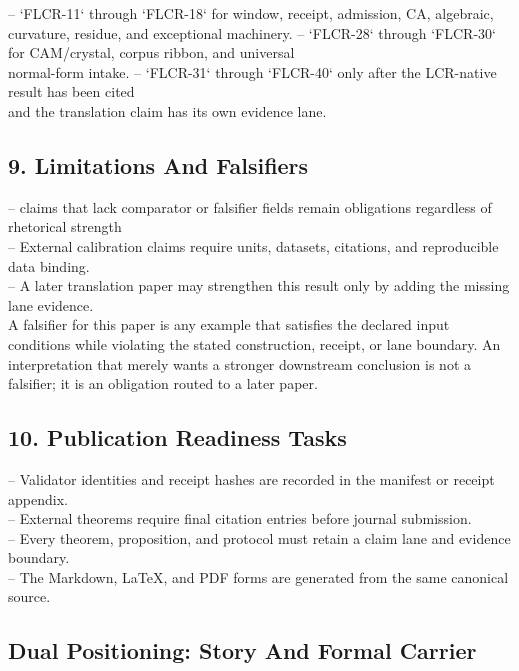 \documentclass[11pt]{article}
\begin{document}
\noindent{}-- `FLCR-11` through `FLCR-18` for window, receipt, admission, CA, algebraic,\\
  curvature, residue, and exceptional machinery.
\noindent{}-- `FLCR-28` through `FLCR-30` for CAM/crystal, corpus ribbon, and universal\\
  normal-form intake.
\noindent{}-- `FLCR-31` through `FLCR-40` only after the LCR-native result has been cited\\
  and the translation claim has its own evidence lane.

\subsection*{9. Limitations And Falsifiers}

\noindent{}-- claims that lack comparator or falsifier fields remain obligations regardless of rhetorical strength\\
\noindent{}-- External calibration claims require units, datasets, citations, and reproducible data binding.\\
\noindent{}-- A later translation paper may strengthen this result only by adding the missing lane evidence.\\

A falsifier for this paper is any example that satisfies the declared input
conditions while violating the stated construction, receipt, or lane boundary.
An interpretation that merely wants a stronger downstream conclusion is not a
falsifier; it is an obligation routed to a later paper.

\subsection*{10. Publication Readiness Tasks}

\noindent{}-- Validator identities and receipt hashes are recorded in the manifest or receipt appendix.\\
\noindent{}-- External theorems require final citation entries before journal submission.\\
\noindent{}-- Every theorem, proposition, and protocol must retain a claim lane and evidence boundary.\\
\noindent{}-- The Markdown, LaTeX, and PDF forms are generated from the same canonical source.\\

\subsection*{Dual Positioning: Story And Formal Carrier}
\end{document}
